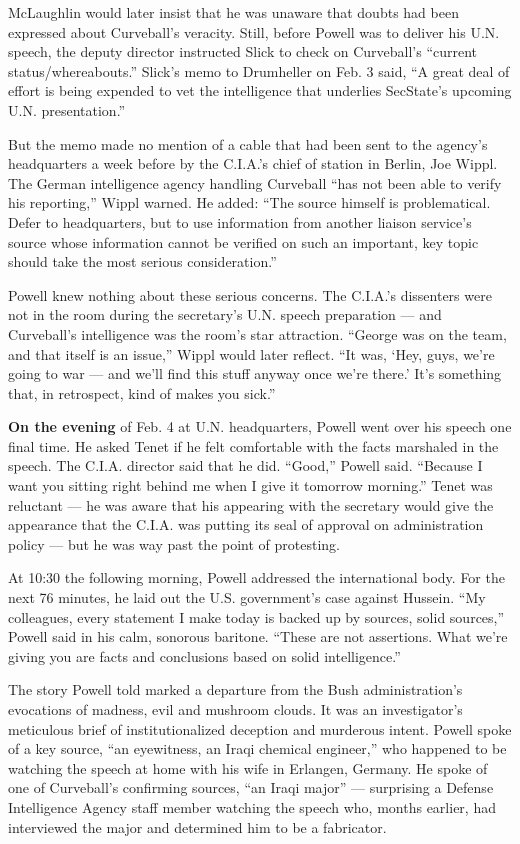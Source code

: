 McLaughlin would later insist that he was unaware that doubts had been
expressed about Curveball's veracity. Still, before Powell was to
deliver his U.N. speech, the deputy director instructed Slick to check
on Curveball's ``current status/whereabouts.'' Slick's memo to
Drumheller on Feb. 3 said, ``A great deal of effort is being expended to
vet the intelligence that underlies SecState's upcoming U.N.
presentation.''

But the memo made no mention of a cable that had been sent to the
agency's headquarters a week before by the C.I.A.'s chief of station in
Berlin, Joe Wippl. The German intelligence agency handling Curveball
``has not been able to verify his reporting,'' Wippl warned. He added:
``The source himself is problematical. Defer to headquarters, but to use
information from another liaison service's source whose information
cannot be verified on such an important, key topic should take the most
serious consideration.''

Powell knew nothing about these serious concerns. The C.I.A.'s
dissenters were not in the room during the secretary's U.N. speech
preparation --- and Curveball's intelligence was the room's star
attraction. ``George was on the team, and that itself is an issue,''
Wippl would later reflect. ``It was, `Hey, guys, we're going to war ---
and we'll find this stuff anyway once we're there.' It's something that,
in retrospect, kind of makes you sick.''

\textbf{On the evening} of Feb. 4 at U.N. headquarters, Powell went over
his speech one final time. He asked Tenet if he felt comfortable with
the facts marshaled in the speech. The C.I.A. director said that he did.
``Good,'' Powell said. ``Because I want you sitting right behind me when
I give it tomorrow morning.'' Tenet was reluctant --- he was aware that
his appearing with the secretary would give the appearance that the
C.I.A. was putting its seal of approval on administration policy --- but
he was way past the point of protesting.

At 10:30 the following morning, Powell addressed the international body.
For the next 76 minutes, he laid out the U.S. government's case against
Hussein. ``My colleagues, every statement I make today is backed up by
sources, solid sources,'' Powell said in his calm, sonorous baritone.
``These are not assertions. What we're giving you are facts and
conclusions based on solid intelligence.''

The story Powell told marked a departure from the Bush administration's
evocations of madness, evil and mushroom clouds. It was an
investigator's meticulous brief of institutionalized deception and
murderous intent. Powell spoke of a key source, ``an eyewitness, an
Iraqi chemical engineer,'' who happened to be watching the speech at
home with his wife in Erlangen, Germany. He spoke of one of Curveball's
confirming sources, ``an Iraqi major'' --- surprising a Defense
Intelligence Agency staff member watching the speech who, months
earlier, had interviewed the major and determined him to be a
fabricator.

